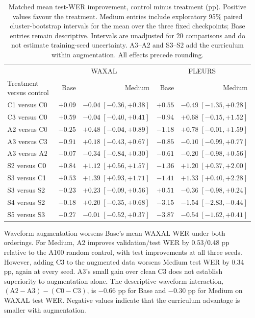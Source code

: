 \documentclass[12pt,a4paper]{report}
\begin{document}
\begin{table}[htbp]\centering\scriptsize
\caption{Matched mean test-WER improvement, control minus treatment (pp).
Positive values favour the treatment. Medium entries include exploratory
95\% paired cluster-bootstrap intervals for the mean over the three fixed
checkpoints; Base entries remain descriptive. Intervals are unadjusted for
20 comparisons and do not estimate training-seed uncertainty. A3--A2 and
S3--S2 add the curriculum within augmentation. All effects precede rounding.}
\label{tab:effects}
\begin{tabular}{lrrrr}\toprule
 & \multicolumn{2}{c}{WAXAL} & \multicolumn{2}{c}{FLEURS}\\
Treatment versus control & Base & Medium & Base & Medium\\\midrule
C1 versus C0 & $+0.09$ & $-0.04\;[-0.36, +0.38]$ & $+0.55$ & $-0.49\;[-1.35, +0.28]$ \\
C3 versus C0 & $+0.59$ & $-0.04\;[-0.40, +0.41]$ & $-0.94$ & $+0.68\;[-0.15, +1.52]$ \\
A2 versus C0 & $-0.25$ & $+0.48\;[-0.04, +0.89]$ & $-1.18$ & $+0.78\;[-0.01, +1.59]$ \\
A3 versus C3 & $-0.91$ & $+0.18\;[-0.43, +0.67]$ & $-0.85$ & $-0.10\;[-0.99, +0.77]$ \\
A3 versus A2 & $-0.07$ & $-0.34\;[-0.84, +0.30]$ & $-0.61$ & $-0.20\;[-0.98, +0.56]$ \\
S2 versus C0 & $+0.84$ & $+1.12\;[+0.56, +1.57]$ & $-1.36$ & $+1.20\;[+0.37, +2.00]$ \\
S3 versus C1 & $+0.53$ & $+1.39\;[+0.93, +1.71]$ & $-1.41$ & $+1.33\;[+0.40, +2.28]$ \\
S3 versus S2 & $-0.23$ & $+0.23\;[-0.09, +0.56]$ & $+0.51$ & $-0.36\;[-0.98, +0.24]$ \\
S4 versus S2 & $-0.18$ & $+0.20\;[-0.35, +0.68]$ & $-3.15$ & $-1.54\;[-2.83, -0.44]$ \\
S5 versus S3 & $-0.27$ & $-0.01\;[-0.52, +0.37]$ & $-3.87$ & $-0.54\;[-1.62, +0.41]$ \\
\bottomrule\end{tabular}\end{table}

Waveform augmentation worsens Base's mean WAXAL WER under both orderings.
For Medium, A2 improves validation/test WER by 0.53/0.48 pp relative to
the A100 random control, with test improvements at all three seeds. However,
adding C3 to the augmented data worsens Medium test WER by 0.34 pp, again
at every seed. A3's small gain over clean C3 does not establish superiority
to augmentation alone. The descriptive waveform interaction,
$(\mathrm{A2}-\mathrm{A3})-(\mathrm{C0}-\mathrm{C3})$, is $-0.66$ pp for
Base and $-0.30$ pp for Medium on WAXAL test WER. Negative values indicate
that the curriculum advantage is smaller with augmentation.
\end{document}
